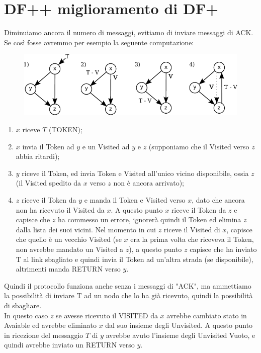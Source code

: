 \section{DF++ miglioramento di DF+}

Diminuiamo ancora il numero di messaggi, evitiamo di inviare messaggi di ACK. Se
così fosse avremmo per esempio la seguente computazione:

\begin{figure}[H]
    \centering
    \includegraphics[width=13cm, keepaspectratio]{images/n_17}
\end{figure}

\begin{enumerate}
    \item $x$ riceve $T$ (TOKEN);
    \item $x$ invia il Token ad $y$ e un Visited ad $y$ e $z$ (supponiamo che il
          Visited verso $z$ abbia ritardi);
    \item $y$ riceve il Token, ed invia Token e Visited all'unico vicino
          disponibile, ossia $z$ (il Visited spedito da $x$ verso $z$ non è ancora
          arrivato);
    \item $z$ riceve il Token da $y$ e manda il Token e Visited verso $x$, dato
          che ancora non ha ricevuto il Visited da $x$. A questo punto $x$ riceve il
          Token da $z$ e capisce che $z$ ha commesso un errore, ignorerà quindi il Token
          ed elimina $z$ dalla lista dei suoi vicini. Nel momento in cui $z$ riceve il
          Visited di $x$, capisce che quello è un vecchio Visited (se $x$ era la prima
          volta che riceveva il Token, non avrebbe mandato un Visited a $z$), a questo
          punto $z$ capisce che ha inviato T al link sbagliato e quindi invia il Token
          ad un'altra strada (se disponibile), altrimenti manda RETURN verso $y$.
\end{enumerate}
Quindi il protocollo funziona anche senza i messaggi di "ACK", ma ammettiamo la
possibilità di inviare T ad un nodo che lo ha già ricevuto, quindi la
possibilità di sbagliare.\\
In questo caso $z$ se avesse ricevuto il VISITED da $x$ avrebbe cambiato stato
in Avaiable ed avrebbe eliminato $x$ dal suo insieme degli Unvisited. A questo
punto in ricezione del messaggio $T$ di $y$ avrebbe avuto l'insieme degli
Unvisited Vuoto, e quindi avrebbe inviato un RETURN verso $y$.



